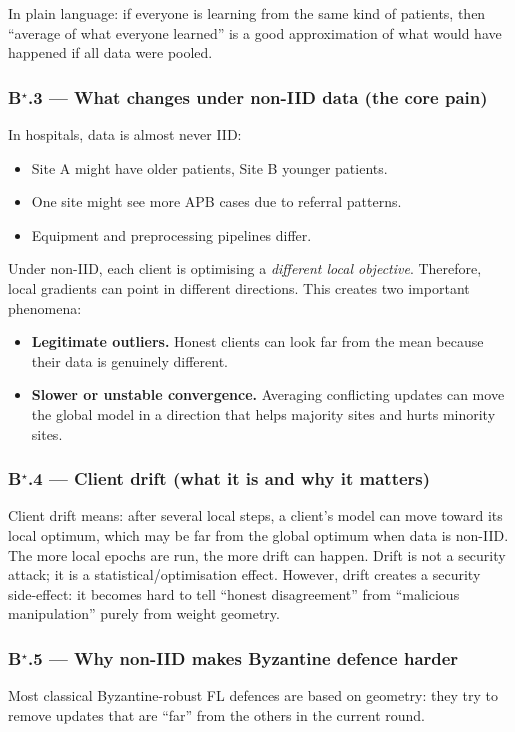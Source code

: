 \documentclass[11pt,a4paper]{article}
\begin{document}
In plain language: if everyone is learning from the same kind of patients, then
``average of what everyone learned'' is a good approximation of what would have
happened if all data were pooled.

\subsubsection{B$^\star$.3 --- What changes under non-IID data (the core pain)}
In hospitals, data is almost never IID:
\begin{itemize}
\item Site A might have older patients, Site B younger patients.
\item One site might see more APB cases due to referral patterns.
\item Equipment and preprocessing pipelines differ.
\end{itemize}

Under non-IID, each client is optimising a \emph{different local objective}.
Therefore, local gradients can point in different directions. This creates two
important phenomena:
\begin{itemize}
\item \textbf{Legitimate outliers.} Honest clients can look far from the mean because their data is genuinely different.
\item \textbf{Slower or unstable convergence.} Averaging conflicting updates can move the global model in a direction that helps majority sites and hurts minority sites.
\end{itemize}

\subsubsection{B$^\star$.4 --- Client drift (what it is and why it matters)}
Client drift means: after several local steps, a client's model can move toward
its local optimum, which may be far from the global optimum when data is non-IID.
The more local epochs are run, the more drift can happen. Drift is not a security
attack; it is a statistical/optimisation effect. However, drift creates a
security side-effect: it becomes hard to tell ``honest disagreement'' from
``malicious manipulation'' purely from weight geometry.

\subsubsection{B$^\star$.5 --- Why non-IID makes Byzantine defence harder}
Most classical Byzantine-robust FL defences are based on geometry: they try to
remove updates that are ``far'' from the others in the current round.
\end{document}
